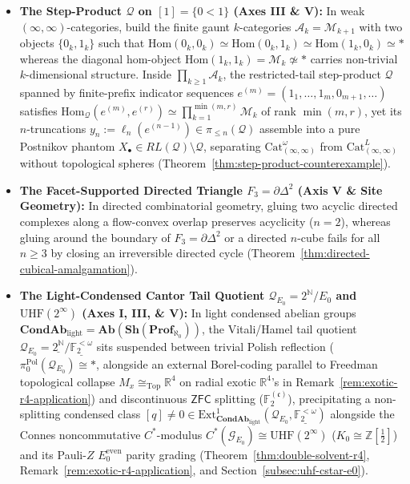 \begin{remark}
\begin{itemize}
  \item \textbf{The Step-Product $\mathcal{Q}$ on $[1] = \{0 < 1\}$ (Axes III \& V):} In weak $(\infty, \infty)$-categories, build the finite gaunt $k$-categories $\mathcal{A}_k = \mathcal{M}_{k+1}$ with two objects $\{0_k, 1_k\}$ such that $\mathrm{Hom}(0_k, 0_k) \simeq \mathrm{Hom}(0_k, 1_k) \simeq \mathrm{Hom}(1_k, 0_k) \simeq *$ whereas the diagonal hom-object $\mathrm{Hom}(1_k, 1_k) = \mathcal{M}_k \not\simeq *$ carries non-trivial $k$-dimensional structure. Inside $\prod_{k \ge 1} \mathcal{A}_k$, the restricted-tail step-product $\mathcal{Q}$ spanned by finite-prefix indicator sequences $e^{(m)} = (1_1, \dots, 1_m, 0_{m+1}, \dots)$ satisfies $\mathrm{Hom}_{\mathcal{Q}}(e^{(m)}, e^{(r)}) \simeq \prod_{k=1}^{\min(m, r)} \mathcal{M}_k$ of rank $\min(m, r)$, yet its $n$-truncations $y_n := \ell_n(e^{(n-1)}) \in \pi_{\le n}(\mathcal{Q})$ assemble into a pure Postnikov phantom $X_\bullet \in RL(\mathcal{Q}) \setminus \mathcal{Q}$, separating $\mathrm{Cat}^\omega_{(\infty,\infty)}$ from $\mathrm{Cat}^L_{(\infty,\infty)}$ without topological spheres (Theorem~\ref{thm:step-product-counterexample}).
  \item \textbf{The Facet-Supported Directed Triangle $F_3 = \partial\Delta^2$ (Axis V \& Site Geometry):} In directed combinatorial geometry, gluing two acyclic directed complexes along a flow-convex overlap preserves acyclicity ($n = 2$), whereas gluing around the boundary of $F_3 = \partial\Delta^2$ or a directed $n$-cube fails for all $n \ge 3$ by closing an irreversible directed cycle (Theorem~\ref{thm:directed-cubical-amalgamation}).
  \item \textbf{The Light-Condensed Cantor Tail Quotient $\mathcal{Q}_{E_0} = 2^{\mathbb{N}}/E_0$ and $\mathrm{UHF}(2^\infty)$ (Axes I, III, \& V):} In light condensed abelian groups $\mathbf{CondAb}_{\mathrm{light}} = \mathbf{Ab}(\mathbf{Sh}(\mathbf{Prof}_{\aleph_0}))$, the Vitali/Hamel tail quotient $\mathcal{Q}_{E_0} = \underline{2^{\mathbb{N}}} / \underline{\mathbb{F}_2^{<\omega}}$ sits suspended between trivial Polish reflection ($\pi_0^{\mathrm{Pol}}(\mathcal{Q}_{E_0}) \cong *$, alongside an external Borel-coding parallel to Freedman topological collapse $M_x \cong_{\mathrm{Top}} \mathbb{R}^4$ on radial exotic $\mathbb{R}^4$'s in Remark~\ref{rem:exotic-r4-application}) and discontinuous $\mathsf{ZFC}$ splitting ($\mathbb{F}_2^{(\mathfrak{c})}$), precipitating a non-splitting condensed class $[q] \neq 0 \in \mathrm{Ext}^1_{\mathbf{CondAb}_{\mathrm{light}}}(\mathcal{Q}_{E_0}, \underline{\mathbb{F}_2^{<\omega}})$ alongside the Connes noncommutative $C^*$-modulus $C^*(\mathcal{G}_{E_0}) \cong \mathrm{UHF}(2^\infty)$ ($K_0 \cong \mathbb{Z}[\tfrac{1}{2}]$) and its Pauli-$Z$ $E_0^{\mathrm{even}}$ parity grading (Theorem~\ref{thm:double-solvent-r4}, Remark~\ref{rem:exotic-r4-application}, and Section~\ref{subsec:uhf-cstar-e0}).\qedhere
\end{itemize}
\end{remark}


